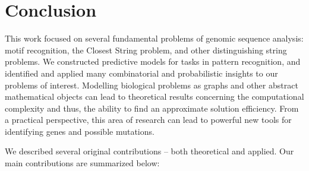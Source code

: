 \chapter{Conclusion} \label{chapter:conclusions}

This work focused on several fundamental problems of genomic sequence analysis: motif recognition, the {\sc Closest String} problem, and other distinguishing string problems. We constructed predictive models for tasks in pattern recognition, and identified and applied many combinatorial and probabilistic insights to our problems of interest.  Modelling biological problems as graphs and other abstract mathematical objects can lead to theoretical results concerning the computational complexity and thus, the ability to find an approximate solution efficiency.  From a practical perspective, this area of research can lead to powerful new tools for identifying genes and possible mutations. 

We described several original contributions -- both theoretical and applied.  Our main contributions are summarized below:

